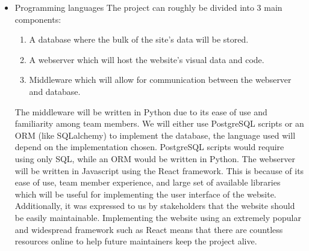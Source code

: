 \documentclass{article}
\begin{document}
\begin{itemize}
\item Programming languages
\subitem The project can roughly be divided into 3 main components:
\begin{enumerate}
  \item A database where the bulk of the site's data will be stored.
  \item A webserver which will host the website's visual data and code.
  \item Middleware which will allow for communication between the 
  webserver and database.
\end{enumerate}
\subitem The middleware will be written in Python due to its ease of use and 
familiarity among team members.
\subitem We will either use PostgreSQL scripts or an ORM (like SQLalchemy) 
to implement the database, the language used will depend on the implementation 
chosen. PostgreSQL scripts would require using only SQL, while an ORM would be written in Python.
\subitem The webserver will be written in Javascript using the React framework.
This is because of its ease of use, team member experience, and large set 
of available libraries which will be useful for implementing the user interface of the website. Additionally, it was expressed to us by stakeholders that the 
website should be easily maintainable. Implementing the website using an 
extremely popular and widespread framework such as React means that there 
are countless resources online to help future maintainers keep the project alive.


\end{itemize}
\end{document}
